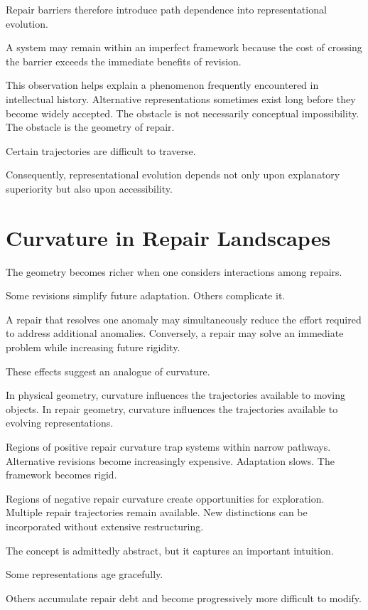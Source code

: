 \documentclass[11pt,oneside,openany]{book}
\begin{document}
Repair barriers therefore introduce path dependence into representational evolution.

A system may remain within an imperfect framework because the cost of crossing the barrier exceeds the immediate benefits of revision.

This observation helps explain a phenomenon frequently encountered in intellectual history. Alternative representations sometimes exist long before they become widely accepted. The obstacle is not necessarily conceptual impossibility. The obstacle is the geometry of repair.

Certain trajectories are difficult to traverse.

Consequently, representational evolution depends not only upon explanatory superiority but also upon accessibility.

\section{Curvature in Repair Landscapes}

The geometry becomes richer when one considers interactions among repairs.

Some revisions simplify future adaptation. Others complicate it.

A repair that resolves one anomaly may simultaneously reduce the effort required to address additional anomalies. Conversely, a repair may solve an immediate problem while increasing future rigidity.

These effects suggest an analogue of curvature.

In physical geometry, curvature influences the trajectories available to moving objects. In repair geometry, curvature influences the trajectories available to evolving representations.

Regions of positive repair curvature trap systems within narrow pathways. Alternative revisions become increasingly expensive. Adaptation slows. The framework becomes rigid.

Regions of negative repair curvature create opportunities for exploration. Multiple repair trajectories remain available. New distinctions can be incorporated without extensive restructuring.

The concept is admittedly abstract, but it captures an important intuition.

Some representations age gracefully.

Others accumulate repair debt and become progressively more difficult to modify.
\end{document}
